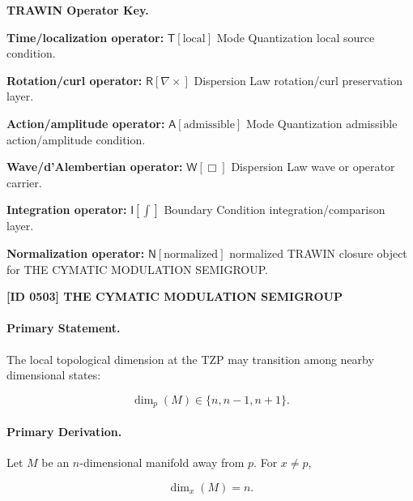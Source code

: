 \par\vspace{0.45\baselineskip}
\noindent\begin{minipage}[t]{\linewidth}
\begingroup
\small
\raggedright
\textbf{TRAWIN Operator Key.}\par
\noindent\textbf{Time/localization operator:} $\mathsf{T}\!\left[\mathrm{local}\right]$ Mode Quantization local source condition.\par
\noindent\textbf{Rotation/curl operator:} $\mathsf{R}\!\left[\nabla\times\right]$ Dispersion Law rotation/curl preservation layer.\par
\noindent\textbf{Action/amplitude operator:} $\mathsf{A}\!\left[\mathrm{admissible}\right]$ Mode Quantization admissible action/amplitude condition.\par
\noindent\textbf{Wave/d'Alembertian operator:} $\mathsf{W}\!\left[\Box\right]$ Dispersion Law wave or operator carrier.\par
\noindent\textbf{Integration operator:} $\mathsf{I}\!\left[\int\right]$ Boundary Condition integration/comparison layer.\par
\noindent\textbf{Normalization operator:} $\mathsf{N}\!\left[\mathrm{normalized}\right]$ normalized TRAWIN closure object for THE CYMATIC MODULATION SEMIGROUP.\par
\endgroup
\end{minipage}

\clearpage
\noindent\textbf{[ID 0503] THE CYMATIC MODULATION SEMIGROUP}\par
\vspace{0.35em}
\paragraph{Primary Statement.}
The local topological dimension at the TZP may transition among nearby dimensional states:

\begin{equation}
\dim_p(M)\in\{n,n-1,n+1\}.
\end{equation}

\paragraph{Primary Derivation.}
Let $M$ be an $n$-dimensional manifold away from $p$. For $x\neq p$,

\begin{equation}
\dim_x(M)=n .
\end{equation}


